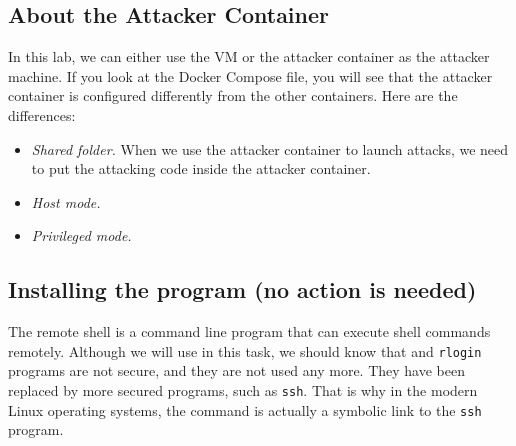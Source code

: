 



\subsection{About the Attacker Container}

In this lab, we can either use the VM or the attacker container
as the attacker machine. If you look at the Docker Compose file, you will
see that the attacker container is configured differently from the other
containers. Here are the differences:

\begin{itemize}
\item \textit{Shared folder.} When we use the attacker container
to launch attacks, we need to put the attacking code inside
the attacker container.


\item \textit{Host mode.}



\item \textit{Privileged mode.}


\end{itemize}


\subsection{Installing the \rsh program (no action is needed)}

The remote shell \rsh is a command line program that can execute shell commands
remotely. Although we will use \rsh in this task, we should know that 
\rsh and \texttt{rlogin} programs are not secure, and they 
are not used any more. They have been replaced by
more secured programs, such as \texttt{ssh}.   
That is why in the modern Linux operating systems, the \rsh command 
is actually a symbolic link to the \texttt{ssh} program. 


